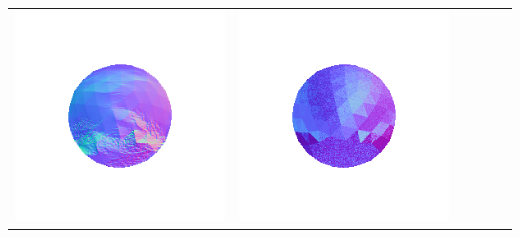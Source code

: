 \begin{tabularx}{\linewidth}{@{}Y@{}Y@{}Y@{}Y@{}Y@{}Y@{}}
\includegraphics[width=\linewidth]{semisynthetic/20160617_1_yu_out.png} &
\includegraphics[width=\linewidth]{semisynthetic/20160617_1_dpsn_out.png} &

\end{tabularx}
